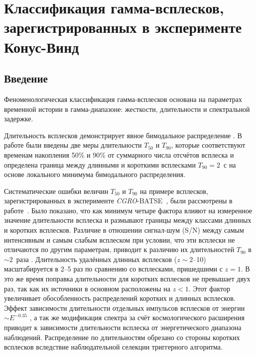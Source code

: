 \chapter{Классификация гамма-всплесков, зарегистрированных в эксперименте Конус-Винд}


\section{Введение}
Феноменологическая классификация  гамма-всплесков основана на параметрах временной истории в гамма-диапазоне: жесткости, длительности и спектральной задержке. 

Длительность всплесков демонстрирует явное бимодальное распределение \citep{Mazets_1981_part_1,Norris_1984,Kouveliotou_1993,Aptekar_1998}. В работе \citep{Kouveliotou_1993} были введены две меры длительности $T_{50}$ и $T_{90}$, которые соответствуют временам накопления 50\% и 90\% от суммарного числа отсчётов всплеска и определена граница между длинными и короткими всплесками $T_{90}=2$~с на основе локального минимума бимодального распределения. 

Систематические ошибки величин $T_{50}$ и $T_{90}$ на примере всплесков, зарегистрированных в эксперименте \textit{CGRO}-BATSE~\citep{Fishman_1994}, были рассмотрены в работе~\citep{Norris_and_Bonnel_2006}. Было показано, что как минимум четыре фактора влияют на измеренное значение длительности всплеска и размывают границы между классами длинных и коротких всплесков. Различие в отношении сигнал-шум (S/N) между самым интенсивным и самым слабым всплеском  при условии, что эти всплески не отличаются по другим параметрам, приводит к различию их длительностей $T_{90}$ в $\sim2$~раза \citep{Bonnell_1997}. Длительность удалённых длинных всплесков ($z\sim2$--10)  масштабируется в 2--5 раз по сравнению со всплесками, пришедшими с $z=1$. В это же время поправка длительности для коротких всплесков не превышает двух раз, так как их источники в основном расположены на $z<1$. Этот фактор увеличивает обособленность распределений коротких и длинных всплесков. Эффект зависимости длительности отдельных импульсов всплесков от энергии $\sim E^{-0.35}$ \citep{Fenimore_1995}, а так же  модификация спектра за счёт космологического расширения приводит к зависимости длительности всплеска от энергетического диапазона наблюдений. Распределение по длительностям обрезано со стороны коротких всплесков вследствие наблюдательной селекции триггерного алгоритма. 

